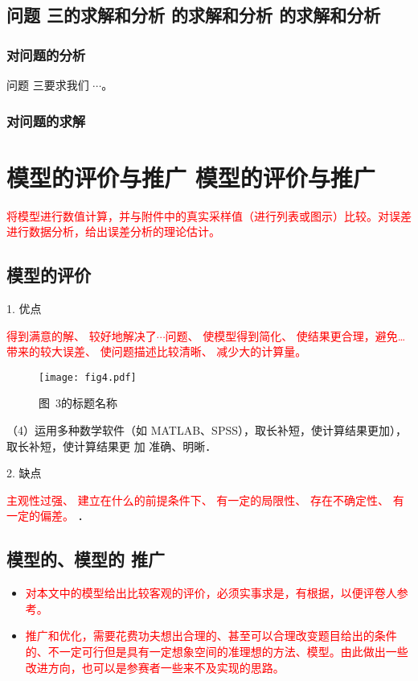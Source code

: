 \documentclass[12pt,a4paper]{mcmthesis}
\begin{document}
\subsection{问题 三的求解和分析 的求解和分析 的求解和分析}

\subsubsection{对问题的分析}

问题 三要求我们 $\cdots$。

\subsubsection{对问题的求解}

\section{模型的评价与推广 模型的评价与推广}

\textcolor{red}{将模型进行数值计算，并与附件中的真实采样值（进行列表或图示）比较。对误差进行数据分析，给出误差分析的理论估计。}

\subsection{模型的评价}


1. 优点

\textcolor{red}{得到满意的解、
较好地解决了$\cdots$问题、
使模型得到简化、
使结果更合理，避免…带来的较大误差、
使问题描述比较清晰、
减少大的计算量。}



\begin{figure}[h!t]
\centerline{\texttt{[image: fig4.pdf]}}
\caption{\song\wuhao 图~3的标题名称}
\end{figure}


（4）运用多种数学软件（如 MATLAB、SPSS），取长补短，使计算结果更加），取长补短，使计算结果更
加 准确、明晰．

2. 缺点

\textcolor{red}{主观性过强、
建立在什么的前提条件下、
有一定的局限性、
存在不确定性、
有一定的偏差。
}
．

\subsection{模型的、模型的 推广}

\begin{itemize}

\item \textcolor{red}{对本文中的模型给出比较客观的评价，必须实事求是，有根据，以便评卷人参考。}

\item \textcolor{red}{推广和优化，需要花费功夫想出合理的、甚至可以合理改变题目给出的条件的、不一定可行但是具有一定想象空间的准理想的方法、模型。由此做出一些改进方向，也可以是参赛者一些来不及实现的思路。}
\end{itemize}
\end{document}
